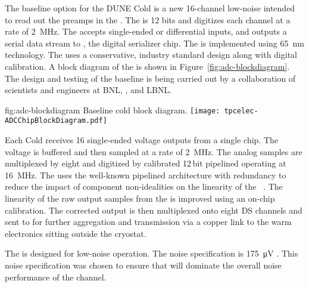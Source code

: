 The baseline option for the DUNE Cold  is a new \num{16}-channel low-noise   intended to read out the  preamps in the  . The  is \num{12} bits and digitizes each channel at a rate of \SI{2}{MHz}. The  accepts single-ended or differential inputs, and outputs a serial data stream to , the  %
digital serializer chip. The   is implemented using \SI{65}{nm}  technology. The  uses a conservative, industry standard design along with digital calibration. A block diagram of the   is shown in Figure~\ref{fig:adc-blockdiagram}. The design and testing of the baseline   is being carried out by a collaboration of scientists and engineers at BNL, \fnal, and LBNL.

\begin{dunefigure}
{fig:adc-blockdiagram}
{Baseline cold   block diagram.}
\texttt{[image: tpcelec-ADCChipBlockDiagram.pdf]}
\end{dunefigure}

Each Cold  receives \num{16} single-ended voltage outputs from a single  chip. The voltage is buffered and then sampled at a rate of \SI{2}{MHz}. The analog samples are multiplexed by eight and digitized by calibrated \num{12}\,bit pipelined  operating at \SI{16}{MHz}. The  uses the well-known pipelined architecture with redundancy to reduce the impact of component non-idealities on the linearity of the ~\cite{121557}. The linearity of the raw output samples from the  is improved using an on-chip calibration. The corrected  output is then multiplexed onto eight DS channels and sent to  for further aggregation and transmission via a copper link to the warm electronics sitting outside the cryostat.

The   is designed for low-noise operation. The noise specification is \SI{175}{\micro\volt} \rms. This noise specification was chosen to ensure that  will dominate the overall noise performance of the channel.


